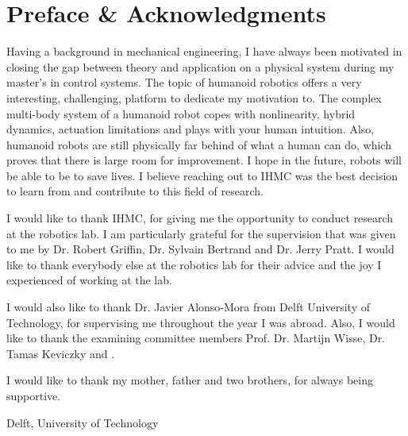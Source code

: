 %
\chapter{Preface \& Acknowledgments}%
Having a background in mechanical engineering, I have always been motivated in closing the gap between theory and application on a physical system during my master's in control systems. The topic of humanoid robotics offers a very interesting, challenging, platform to dedicate my motivation to. The complex multi-body system of a humanoid robot copes with nonlinearity, hybrid dynamics, actuation limitations and plays with your human intuition. Also, humanoid robots are still physically far behind of what a human can do, which proves that there is large room for improvement. I hope in the future, robots will be able to be to save lives. I believe reaching out to \ac{IHMC} was the best decision to learn from and contribute to this field of research.

I would like to thank \ac{IHMC}, for giving me the opportunity to conduct research at the robotics lab. I am particularly grateful for the supervision that was given to me by Dr. Robert Griffin, Dr. Sylvain Bertrand and Dr. Jerry Pratt. I would like to thank everybody else at the robotics lab for their advice and the joy I experienced of working at the lab. 

I would also like to thank Dr. Javier Alonso-Mora from Delft University of Technology, for supervising me throughout the year I was abroad. Also, I would like to thank the examining committee members Prof. Dr. Martijn Wisse, Dr. Tamas Keviczky and .

I would like to thank my mother, father and two brothers, for always being supportive.

\vspace*{15mm}

Delft, University of Technology \hfill \mscname \\
\mscdate